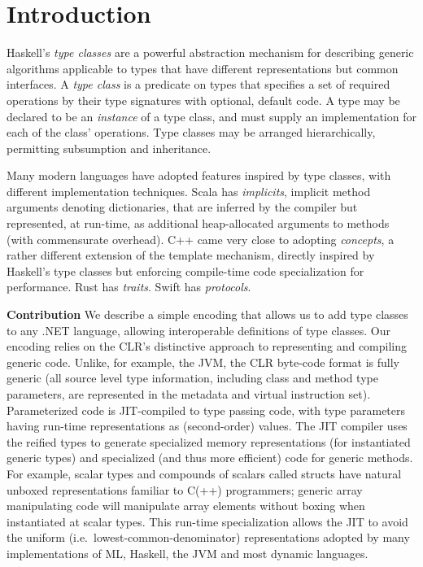 \documentclass[9pt]{sig-alternate-05-2015}
\begin{document}


\section{Introduction}


Haskell's \emph{type classes} \cite{peytonjones:h98,WadlerBlott} are a powerful abstraction mechanism for describing generic algorithms applicable to types that have different representations but common interfaces.
A \emph{type class} is a predicate on types that specifies a set of required operations by their type signatures with  optional, default code.
A type may be declared to be an \emph{instance} of a type class, and must supply an implementation for each of the class' operations. 
Type classes may be arranged hierarchically, permitting subsumption and inheritance. 

Many modern languages have adopted features inspired
by type classes, with different implementation techniques.  Scala has
\emph{implicits}\cite{scalaimplicits}, implicit method arguments denoting dictionaries, that
are inferred by the compiler but represented, at run-time, as additional
heap-allocated arguments to methods (with commensurate overhead).  C++ came very
close to adopting \emph{concepts}\cite{cppconcepts}, a rather different extension of the template mechanism, 
directly inspired by Haskell's type classes but enforcing  compile-time code specialization for performance. Rust has \emph{traits}\cite{Rust}. Swift has
\emph{protocols}\cite{Swift}.

{\bf Contribution} We describe a simple encoding that allows us to add type classes to
any .NET language, allowing interoperable definitions of type
classes. Our encoding relies on the CLR's distinctive approach to
representing and compiling generic code\cite{genericspldi,genericspopl}. Unlike, for example, the JVM, the CLR
byte-code format is fully generic (all source level type information,
including class and method type parameters, are represented in the
metadata and virtual instruction set).  Parameterized code is JIT-compiled to type passing code,
with type parameters having run-time representations as (second-order)
values.  The JIT compiler uses the reified types to generate
specialized memory representations (for instantiated generic types)
and specialized (and thus more efficient) code for generic
methods. For example, scalar types and compounds of scalars called
structs have natural unboxed representations familiar to C(++)
programmers; generic array manipulating code will manipulate array
elements without boxing when instantiated at scalar types.  This run-time
specialization allows the JIT to avoid the uniform (i.e.\ lowest-common-denominator) representations adopted by many implementations of ML, 
Haskell, the JVM and most dynamic languages.
\end{document}
